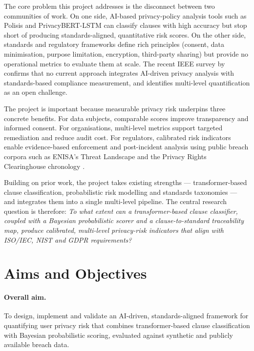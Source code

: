 \documentclass[12pt,a4paper,titlepage]{article}
\begin{document}
The core problem this project addresses is the disconnect between two communities of work. On one side, AI-based privacy-policy analysis tools such as Polisis \parencite{harkous2018polisis} and PrivacyBERT-LSTM \parencite{muralitharan2024privacybertlstm} can classify clauses with high accuracy but stop short of producing standards-aligned, quantitative risk scores. On the other side, standards and regulatory frameworks define rich principles (consent, data minimisation, purpose limitation, encryption, third-party sharing) but provide no operational metrics to evaluate them at scale. The recent IEEE survey by \textcite{arshad2024characterisation} confirms that no current approach integrates AI-driven privacy analysis with standards-based compliance measurement, and identifies multi-level quantification as an open challenge.

The project is important because measurable privacy risk underpins three concrete benefits. For data subjects, comparable scores improve transparency and informed consent. For organisations, multi-level metrics support targeted remediation and reduce audit cost. For regulators, calibrated risk indicators enable evidence-based enforcement and post-incident analysis using public breach corpora such as ENISA's Threat Landscape \parencite{enisa_tl_2024} and the Privacy Rights Clearinghouse chronology \parencite{prc_breaches}.

Building on prior work, the project takes existing strengths --- transformer-based clause classification, probabilistic risk modelling and standards taxonomies --- and integrates them into a single multi-level pipeline. The central research question is therefore: \emph{To what extent can a transformer-based clause classifier, coupled with a Bayesian probabilistic scorer and a clause-to-standard traceability map, produce calibrated, multi-level privacy-risk indicators that align with ISO/IEC, NIST and GDPR requirements?}

\section{Aims and Objectives}\label{sec:aims}

\paragraph{Overall aim.}
To design, implement and validate an AI-driven, standards-aligned framework for quantifying user privacy risk that combines transformer-based clause classification with Bayesian probabilistic scoring, evaluated against synthetic and publicly available breach data.
\end{document}
